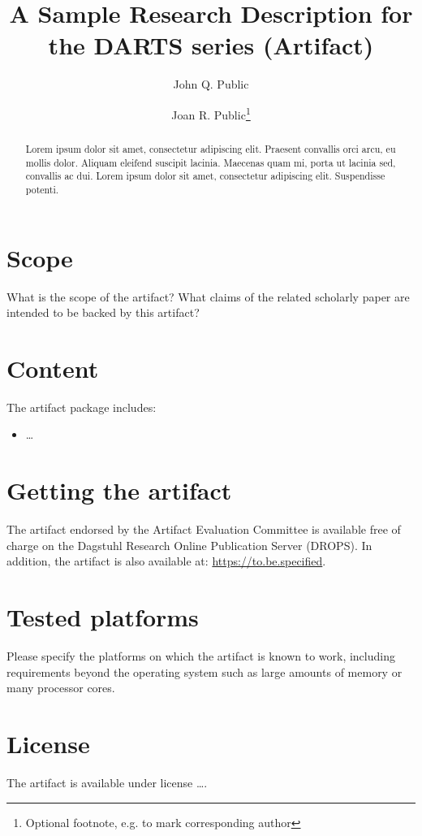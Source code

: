 \documentclass[a4paper,UKenglish]{darts-v2019}
\title{A Sample Research Description for the DARTS series (Artifact)} %
\author{John Q. Public}{Dummy University Computing Laboratory, [optional: Address], Country \and My second affiliation, Country \and \url{http://www.myhomepage.edu} }{johnqpublic@dummyuni.org}{https://orcid.org/0000-0002-1825-0097}{(Optional) author-specific funding acknowledgements}%
\author{Joan R. Public\footnote{Optional footnote, e.g. to mark corresponding author}}{Department of Informatics, Dummy College, [optional: Address], Country}{joanrpublic@dummycollege.org}{[orcid]}{[funding]}
\newenvironment{scope}{\section{Scope}}{}
\newenvironment{content}{\section{Content}}{}
\newenvironment{getting}{\section{Getting the artifact} The artifact 
endorsed by the Artifact Evaluation Committee is available free of 
charge on the Dagstuhl Research Online Publication Server (DROPS).}{}
\newenvironment{platforms}{\section{Tested platforms}}{}
\newcommand{\license}[1]{{\section{License}#1}}
\begin{document}
\maketitle

\begin{abstract}
Lorem ipsum dolor sit amet, consectetur adipiscing elit. Praesent convallis orci arcu, eu mollis dolor. Aliquam eleifend suscipit lacinia. Maecenas quam mi, porta ut lacinia sed, convallis ac dui. Lorem ipsum dolor sit amet, consectetur adipiscing elit. Suspendisse potenti. 
 \end{abstract}


\begin{scope}
What is the scope of the artifact? What claims of the related scholarly paper are intended to be backed by this artifact?
\end{scope}

\begin{content}
The artifact package includes:
\begin{itemize}
\item \dots
\end{itemize}
\end{content}

\begin{getting}
In addition, the artifact is also available at:
\url{https://to.be.specified}.
\end{getting}

\begin{platforms}
Please specify the platforms on which the artifact is known to
work, including requirements beyond the operating system such as large
amounts of memory or many processor cores.
\end{platforms}

\license{The artifact is available under license \dots.}
\end{document}
